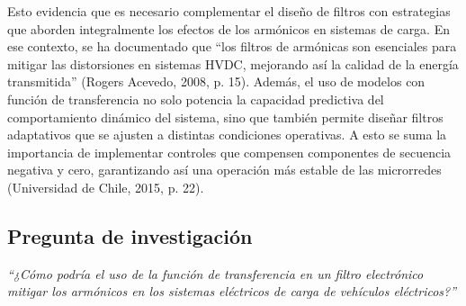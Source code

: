 Esto evidencia que es necesario complementar el dise\~no de filtros con estrategias que aborden integralmente los efectos de los arm\'onicos en sistemas de carga. En ese contexto, se ha documentado que ``los filtros de arm\'onicas son esenciales para mitigar las distorsiones en sistemas HVDC, mejorando as\'i la calidad de la energ\'ia transmitida'' (Rogers Acevedo, 2008, p. 15). Adem\'as, el uso de modelos con funci\'on de transferencia no solo potencia la capacidad predictiva del comportamiento din\'amico del sistema, sino que tambi\'en permite dise\~nar filtros adaptativos que se ajusten a distintas condiciones operativas. A esto se suma la importancia de implementar controles que compensen componentes de secuencia negativa y cero, garantizando as\'i una operaci\'on m\'as estable de las microrredes (Universidad de Chile, 2015, p. 22).

\subsection*{Pregunta de investigaci\'on}
\textit{“¿C\'omo podr\'ia el uso de la funci\'on de transferencia en un filtro electr\'onico mitigar los arm\'onicos en los sistemas el\'ectricos de carga de veh\'iculos el\'ectricos?”}
